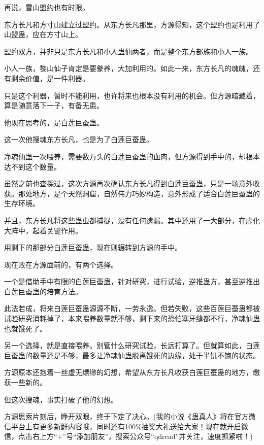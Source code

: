 \begin{this_body}
再说，雪山盟约也有时限。

东方长凡和方寸山建立过盟约。从东方长凡那里，方源得知，这个盟约也是利用了山盟蛊，应在方寸山上。

盟约双方，并非只是东方长凡和小人蛊仙两者，而是整个东方部族和小人一族。

小人一族，黎山仙子肯定是要豢养，大加利用的。如此一来，东方长凡的魂魄，还有剩余价值，是一件利器。

只是这个利器，暂时不能利用，也许将来也根本没有利用的机会。但方源暗藏着，算是随意落下一子，有备无患。

他现在思考的，是白莲巨蚕蛊。

这一次他搜魂东方长凡，也是为了白莲巨蚕蛊。

净魂仙蛊一次喂养，需要数万头的白莲巨蚕蛊的血肉，但方源得到手中的，却根本达不到这个数量。

虽然之前也查探过，这次方源再次确认东方长凡得到白莲巨蚕蛊，只是一场意外收获。那处地方，是个天然洞窟，自然伟力巧妙构造，意外形成了适合白莲巨蚕蛊的生存环境。

并且，东方长凡将这些蛊虫都捕捉，没有任何遗漏。其中还用了一大部分，在虚化大阵中，起着关键作用。

用剩下的那部分白莲巨蚕蛊，现在则辗转到方源的手中。

现在败在方源面前的，有两个选择。

一个是借助手中有限的白莲巨蚕蛊，针对研究，进行试验，逆推蛊方，甚至逆推出白莲巨蚕蛊的培育方法。

此法若成，将来白莲巨蚕蛊源源不断，一劳永逸。但若失败，这些百莲巨蚕蛊都被试验研究消耗掉了，本来喂养数量就不够，剩下来的恐怕塞牙缝都不行，净魂仙蛊也就饿死了。

另一个选择，就是直接喂养。别管什么研究试验，长远打算了。但就算如此，白莲巨蚕蛊的数量还是不够，最多让净魂仙蛊脱离饿死的边缘，处于半饥不饱的状态。

方源原本还抱着一丝虚无缥缈的幻想，希望从东方长凡收获白莲巨蚕蛊的地方，缴获一些新的。

但这次搜魂，事实打破了他的幻想。

方源思索片刻后，睁开双眼，终于下定了决心。(我的小说《蛊真人》将在官方微信平台上有更多新鲜内容哦，同时还有100\%抽奖大礼送给大家！现在就开启微信，点击右上方“+”号“添加朋友”，搜索公众号“qdread”并关注，速度抓紧啦！)

\end{this_body}

